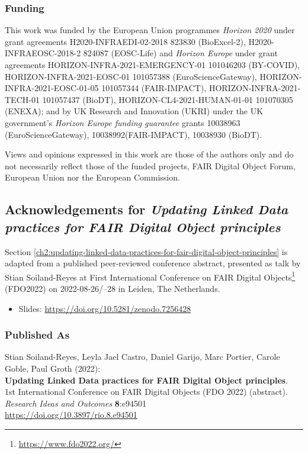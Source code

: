 \subsubsection*{Funding}

This work was funded by the European Union programmes \emph{Horizon 2020} under grant agreements H2020-INFRAEDI-02-2018 823830 (BioExcel-2), H2020-INFRAEOSC-2018-2 824087 (EOSC-Life) and \emph{Horizon Europe} under grant agreements HORIZON-INFRA-2021-EMERGENCY-01 101046203 (BY-COVID), HORIZON-INFRA-2021-EOSC-01 101057388 (EuroScienceGateway), HORIZON-INFRA-2021-EOSC-01-05 101057344 (FAIR-IMPACT), HORIZON-INFRA-2021-TECH-01 101057437 (BioDT), HORIZON-CL4-2021-HUMAN-01-01 101070305 (ENEXA); and by UK Research and Innovation (UKRI) under the UK government’s \emph{Horizon Europe funding guarantee} grants 10038963 (EuroScienceGateway), 10038992(FAIR-IMPACT), 10038930 (BioDT).

Views and opinions expressed in this work are those of the authors only and do not necessarily reflect those of the funded projects, FAIR Digital Object Forum, European Union nor the European Commission.



\subsection{Acknowledgements for \textit{Updating Linked Data practices for FAIR Digital Object principles}}\label{ch11:updating-ld}


Section \ref{ch2:updating-linked-data-practices-for-fair-digital-object-principles} is adapted from a published peer-reviewed conference abstract,
presented as talk by Stian Soiland-Reyes at 
First International Conference on FAIR Digital Objects\footnote{\url{https://www.fdo2022.org/}} 
(FDO2022) on
2022-08-26/--28 in Leiden, The Netherlands. 


\begin{itemize}
    \item Slides: \url{https://doi.org/10.5281/zenodo.7256428}
\end{itemize}

\subsubsection*{Published As}

Stian Soiland-Reyes, Leyla Jael Castro, Daniel Garijo, Marc Portier, Carole Goble, Paul Groth (2022):\\
\textbf{Updating Linked Data practices for FAIR Digital Object principles}.\\
1st International Conference on FAIR Digital Objects (FDO 2022) (abstract).\\
\textit{Research Ideas and Outcomes} \textbf{8}:e94501\\
\url{https://doi.org/10.3897/rio.8.e94501}



